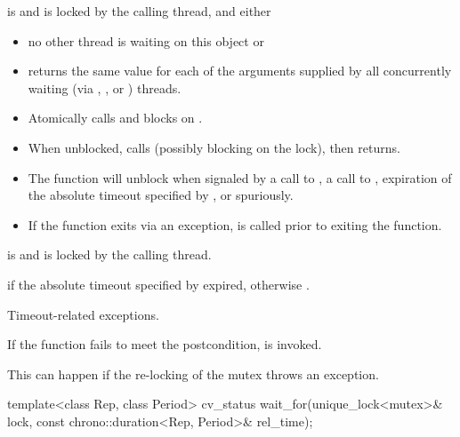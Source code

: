 \begin{itemdescr}
\pnum
\expects
{} is  and 
is locked by the calling thread, and either
\begin{itemize}
\item no other thread is waiting on this  object or
\item {} returns the same value for each of the 
arguments supplied by all concurrently waiting (via ,
, or ) threads.
\end{itemize}

\pnum
\effects
\begin{itemize}
\item
Atomically calls  and blocks on .

\item
When unblocked, calls  (possibly blocking on the lock), then returns.

\item
The function will unblock when signaled by a call to , a call to ,
expiration of the absolute timeout specified by ,
or spuriously.

\item
If the function exits via an exception,  is called prior to exiting the function.
\end{itemize}

\pnum
\ensures
{} is  and 
is locked by the calling thread.

\pnum
\returns
{} if
the absolute timeout specified by  expired,
otherwise .

\pnum
\throws
Timeout-related
exceptions.

\pnum
\remarks
If the function fails to meet the postcondition, 
is invoked.
\begin{note}
This can happen if the re-locking of the mutex throws an exception.
\end{note}
\end{itemdescr}

%
\begin{itemdecl}
template<class Rep, class Period>
  cv_status wait_for(unique_lock<mutex>& lock,
                     const chrono::duration<Rep, Period>& rel_time);
\end{itemdecl}

